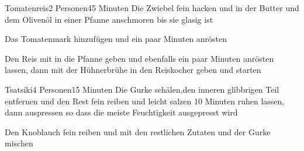 
\begin{recipe}{Tomatenreis}{2 Personen}{45 Minuten}
Die Zwiebel fein hacken und in der Butter und dem Olivenöl in einer Pfanne anschmoren bis sie glasig ist

Das Tomatenmark hinzufügen und ein paar Minuten anrösten

Den Reis mit in die Pfanne geben und ebenfalls ein paar Minuten anrösten lassen, dann mit der Hühnerbrühe in den Reiskocher geben und starten
\end{recipe}


\begin{recipe}{Tsatsiki}{4 Personen}{15 Minuten}
Die Gurke schälen,den inneren glibbrigen Teil entfernen und den Rest fein reiben und leicht salzen
10 Minuten ruhen lassen, dann auspressen so dass die meiste Feuchtigkeit ausgepresst wird

Den Knoblauch fein reiben und mit den restlichen Zutaten und der Gurke mischen
\end{recipe}

